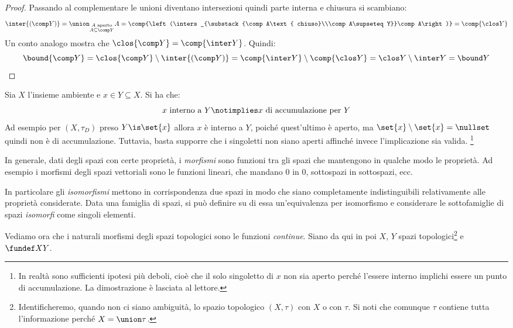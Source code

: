 \begin{proof}
	Passando al complementare le unioni diventano intersezioni quindi parte interna e chiusura si scambiano:
	\[\inter{(\comp Y)}=
	\union_{\substack{A\text{ aperto}\\A\subseteq\comp Y}}A=
	\comp{\left(\inters_{\substack{\comp A\text{ chiuso}\\\comp A\supseteq Y}}\comp A\right)}=
	\comp{\clos Y}\]
	Un conto analogo mostra che $\clos{\comp Y}=\comp{\inter Y}$.
	Quindi:
	\[\bound{\comp Y}=\clos{\comp Y}\setminus\inter{(\comp Y)}=\comp{\inter Y}\setminus\comp{\clos Y}=\clos Y\setminus\inter Y=\bound Y \qedhere\]
\end{proof}

\begin{oss}
	Sia $X$ l'insieme ambiente e $x\in Y\subseteq X$.
	Si ha che:
	\[\text{$x$ interno a $Y$} \notimplies \text{$x$ di accumulazione per $Y$}\]
	Ad esempio per $(X, \tau_D)$ preso $Y\is\set{x}$ allora $x$ è interno a $Y$, poiché quest'ultimo è aperto, ma $\set{x}\setminus\set{x} = \nullset$ quindi non è di accumulazione.
	Tuttavia, basta supporre che i singoletti non siano aperti affinché invece l'implicazione sia valida.
	\footnote{In realtà sono sufficienti ipotesi più deboli, cioè che il solo singoletto di $x$ non sia aperto perché l'essere interno implichi essere un punto di accumulazione. La dimostrazione è lasciata al lettore.}
\end{oss}


In generale, dati degli spazi con certe proprietà, i \emph{morfismi} sono funzioni tra gli spazi che mantengono in qualche modo le proprietà. Ad esempio i morfismi degli spazi vettoriali sono le funzioni lineari, che mandano 0 in 0, sottospazi in sottospazi, ecc.

In particolare gli \emph{isomorfismi} mettono in corrispondenza due spazi in modo che siano completamente indistinguibili relativamente alle proprietà considerate. Data una famiglia di spazi, si può definire su di essa un'equivalenza per isomorfismo e considerare le sottofamiglie di spazi \emph{isomorfi} come singoli elementi.

Vediamo ora che i naturali morfismi degli spazi topologici sono le funzioni \emph{continue}. Siano da qui in poi $X$, $Y$ spazi topologici\footnote{Identificheremo, quando non ci siano ambiguità, lo spazio topologico $(X,\tau)$ con $X$ o con $\tau$. Si noti che comunque $\tau$ contiene tutta l'informazione perché $X=\union\tau$.} e $\fundef XY$.

